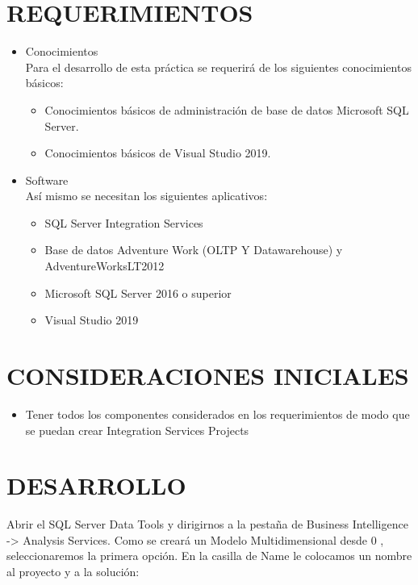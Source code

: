 \documentclass[12pt,letterpaper]{article}
\begin{document}
\section{REQUERIMIENTOS}
\begin{itemize}
    \item Conocimientos\\
          Para el desarrollo de esta práctica se requerirá de los siguientes conocimientos básicos:
          \begin{itemize}
              \item Conocimientos básicos de administración de base de datos Microsoft SQL Server.
              \item Conocimientos básicos de Visual Studio 2019.
          \end{itemize}
    \item Software\\
          Así mismo se necesitan los siguientes aplicativos:
          \begin{itemize}
              \item SQL Server Integration Services
              \item Base de datos Adventure Work (OLTP Y Datawarehouse) y AdventureWorksLT2012
              \item Microsoft SQL Server 2016 o superior
              \item Visual Studio 2019
          \end{itemize}
\end{itemize}

\section{CONSIDERACIONES INICIALES}
\begin{itemize}
    \item Tener todos los componentes considerados en los requerimientos de modo que se puedan crear Integration Services Projects
\end{itemize}

\newpage
\section{DESARROLLO}

Abrir el SQL Server Data Tools y dirigirnos a la pestaña de Business Intelligence -> Analysis Services. Como se creará un Modelo Multidimensional desde 0 , seleccionaremos la primera opción. En la casilla de Name le colocamos un nombre al proyecto y a la solución:
\end{document}
